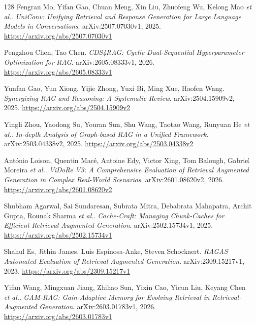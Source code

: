 \documentclass[11pt,a4paper]{article}
\begin{document}
\begin{thebibliography}{128}
Fengran Mo, Yifan Gao, Chuan Meng, Xin Liu, Zhuofeng Wu, Kelong Mao \emph{et al.}.
\newblock \emph{UniConv: Unifying Retrieval and Response Generation for Large Language Models in Conversations}.
\newblock arXiv:2507.07030v1, 2025.
\newblock \url{https://arxiv.org/abs/2507.07030v1}

Pengzhou Chen, Tao Chen.
\newblock \emph{CDS4RAG: Cyclic Dual-Sequential Hyperparameter Optimization for RAG}.
\newblock arXiv:2605.08333v1, 2026.
\newblock \url{https://arxiv.org/abs/2605.08333v1}

Yunfan Gao, Yun Xiong, Yijie Zhong, Yuxi Bi, Ming Xue, Haofen Wang.
\newblock \emph{Synergizing RAG and Reasoning: A Systematic Review}.
\newblock arXiv:2504.15909v2, 2025.
\newblock \url{https://arxiv.org/abs/2504.15909v2}

Yingli Zhou, Yaodong Su, Youran Sun, Shu Wang, Taotao Wang, Runyuan He \emph{et al.}.
\newblock \emph{In-depth Analysis of Graph-based RAG in a Unified Framework}.
\newblock arXiv:2503.04338v2, 2025.
\newblock \url{https://arxiv.org/abs/2503.04338v2}

Ant\'{o}nio Loison, Quentin Mac\'{e}, Antoine Edy, Victor Xing, Tom Balough, Gabriel Moreira \emph{et al.}.
\newblock \emph{ViDoRe V3: A Comprehensive Evaluation of Retrieval Augmented Generation in Complex Real-World Scenarios}.
\newblock arXiv:2601.08620v2, 2026.
\newblock \url{https://arxiv.org/abs/2601.08620v2}

Shubham Agarwal, Sai Sundaresan, Subrata Mitra, Debabrata Mahapatra, Archit Gupta, Rounak Sharma \emph{et al.}.
\newblock \emph{Cache-Craft: Managing Chunk-Caches for Efficient Retrieval-Augmented Generation}.
\newblock arXiv:2502.15734v1, 2025.
\newblock \url{https://arxiv.org/abs/2502.15734v1}

Shahul Es, Jithin James, Luis Espinosa-Anke, Steven Schockaert.
\newblock \emph{RAGAS Automated Evaluation of Retrieval Augmented Generation}.
\newblock arXiv:2309.15217v1, 2023.
\newblock \url{https://arxiv.org/abs/2309.15217v1}

Yifan Wang, Mingxuan Jiang, Zhihao Sun, Yixin Cao, Yicun Liu, Keyang Chen \emph{et al.}.
\newblock \emph{GAM-RAG: Gain-Adaptive Memory for Evolving Retrieval in Retrieval-Augmented Generation}.
\newblock arXiv:2603.01783v1, 2026.
\newblock \url{https://arxiv.org/abs/2603.01783v1}


\end{thebibliography}
\end{document}
